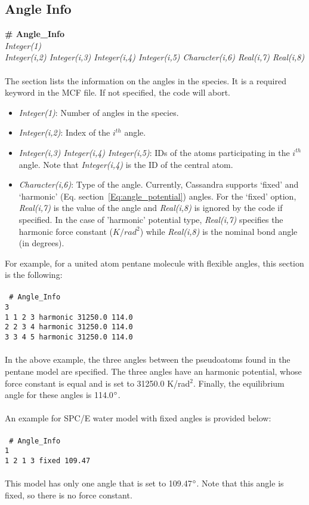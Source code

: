 \subsection{Angle Info}\label{sec:Get_Angle_Info}
%
{\bf \# Angle\_Info} \\
%
{\it Integer(1)} \\
%
{\it Integer(i,2) Integer(i,3) Integer(i,4) Integer(i,5)
  Character(i,6) Real(i,7) Real(i,8)} \\ \\
%
The section lists the information on the angles in the species. 
It is a required keyword in the MCF file. If not specified, the code
will abort. \\ 
%
\begin{itemize}
\item {\it Integer(1)}: Number of angles in the species. 
%
\item {\it Integer(i,2)}: Index of the $i^{th}$ angle. 
%
\item {\it Integer(i,3) Integer(i,4) Integer(i,5)}: IDs of the atoms
participating in the $i^{th}$ angle. Note that {\it Integer(i,4)} is
the ID of the central atom.
%
\item {\it Character(i,6)}: Type of the angle. Currently,
Cassandra supports `fixed' and `harmonic' (Eq. section~\ref{Eq:angle_potential})
angles. For the `fixed' option, {\it Real(i,7)} is the value of the
angle and {\it Real(i,8)} is ignored by the code if specified. In the
case of 'harmonic' potential type, {\it Real(i,7)} specifies the
harmonic force constant ($K/rad^2$) while {\it Real(i,8)} is the nominal bond
angle (in degrees).

\end{itemize}
For example, for a united atom pentane molecule with flexible angles, this section is the following: \\ \\
%
\texttt{
\# Angle\_Info \\
3 \\
1    1    2    3    harmonic     31250.0    114.0\\
2    2    3    4    harmonic     31250.0    114.0\\
3    3    4    5    harmonic     31250.0    114.0\\
} \\ 
%
In the above example, the three angles between the pseudoatoms found in the pentane model are specified.
The three angles have an harmonic potential, whose force constant is equal and is set to 31250.0 K/rad$^2$.
Finally, the equilibrium angle for these angles is 114.0$\degree$. \\ \\
%
An example for SPC/E water model with fixed angles is provided below: \\ \\
%
\texttt{
\# Angle\_Info \\
1 \\
1    2    1    3   fixed  109.47 \\
} \\
This model has only one angle that is set to 109.47$\degree$. Note that this angle is fixed, so there is no
force constant. 
%

